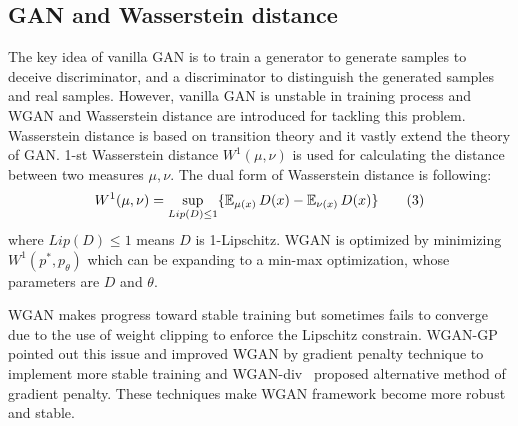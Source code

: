 \subsection{GAN and Wasserstein distance}

The key idea of vanilla GAN is to train a generator to generate samples to deceive discriminator, and a discriminator to distinguish the generated samples and real samples. However, vanilla GAN is unstable in training process and WGAN and Wasserstein distance are introduced for tackling this problem. Wasserstein distance is based on transition theory and it vastly extend the theory of GAN. 1-st Wasserstein distance $W^1(\mu, \nu)$ is used for calculating the distance between two measures $\mu, \nu$. The dual form of Wasserstein distance is following:
\begin{align*} \label{eq:Wasserstein-distance}
W^1(\mu, \nu) = \sup_{Lip(D) \leq 1} \{\operatorname{\mathbb{E}}_{\mu(x)} D(x)  - \operatorname{\mathbb{E}}_{\nu(x)} D(x)\} \tag{3}
\end{align*}
where $Lip(D) \leq 1$ means $D$ is 1-Lipschitz. WGAN is optimized by minimizing $W^1(p^*, p_\theta)$ which can be expanding to a min-max optimization, whose parameters are $D$ and $\theta$. 

WGAN makes progress toward stable training but sometimes fails to converge due to the use of weight clipping to enforce the Lipschitz constrain. WGAN-GP~\cite{gulrajani2017improved} pointed out this issue and improved WGAN by gradient penalty technique to implement more stable training and WGAN-div~\cite{wu2018wasserstein} proposed alternative method of gradient penalty. These techniques make WGAN framework become more robust and stable. 
